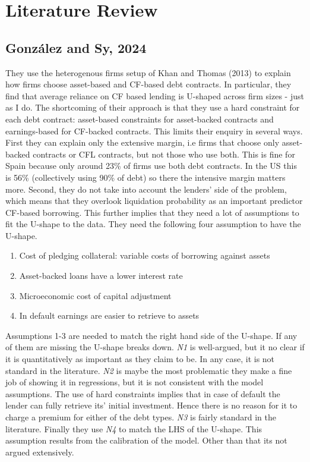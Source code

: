 \documentclass[12pt]{article}
\begin{document}
\section*{Literature Review}
\subsection*{González and Sy, 2024}
They use the heterogenous firms setup of Khan and Thomas (2013) to explain how firms choose asset-based and CF-based debt contracts. In particular, they find that average reliance on CF based lending is U-shaped across firm sizes - just as I do. The shortcoming of their approach is that they use a hard constraint for each debt contract: asset-based constraints for asset-backed contracts and earnings-based for CF-backed contracts. This limits their enquiry in several ways. First they can explain only the extensive margin, i.e firms that choose only asset-backed contracts or CFL contracts, but not those who use both. This is fine for Spain because only around 23\% of firms use both debt contracts. In the US this is 56\% (collectively using 90\% of debt) so there the intensive margin matters more. Second, they do not take into account the lenders' side of the problem, which means that they overlook liquidation probability as an important predictor CF-based borrowing. This further implies that they need a lot of assumptions to fit the U-shape to the data. They need the following four assumption to have the U-shape. 
\begin{enumerate} \setlength\itemsep{0em} 
    \item Cost of pledging collateral: variable costs of borrowing against assets
    \item Asset-backed loans have a lower interest rate 
    \item Microeconomic cost of capital adjustment
    \item In default earnings are easier to retrieve to assets
\end{enumerate}
Assumptions 1-3 are needed to match the right hand side of the U-shape. If any of them are missing the U-shape breaks down. \textit{N1} is well-argued, but it no clear if it is quantitatively as important as they claim to be. In any case, it is not standard in the literature. \textit{N2} is maybe the most problematic they make a fine job of showing it in regressions, but it is not consistent with the model assumptions. The use of hard constraints implies that in case of default the lender can fully retrieve its' initial investment. Hence there is no reason for it to charge a premium for either of the debt types. \textit{N3} is fairly standard in the literature. Finally they use \textit{N4} to match the LHS of the U-shape. This assumption results from the calibration of the model. Other than that its not argued extensively. \vspace{3mm} \\
\end{document}
